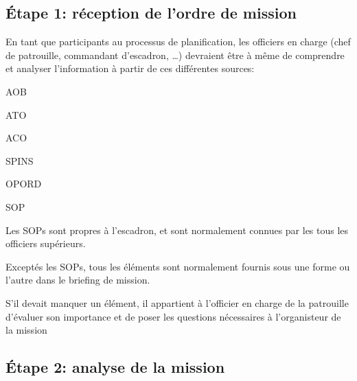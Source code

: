 \subsection{Étape 1: réception de l’ordre de mission}

\e
    \item
    En tant que participants au processus de planification, les officiers en charge (chef de patrouille, commandant d’escadron, …) devraient être à même de comprendre et analyser l’information à partir de ces différentes sources:
    \ee
        \item AOB
        \item ATO
        \item ACO
        \item SPINS
        \item OPORD
        \item SOP
    \ed
    \item Les SOPs sont propres à l'escadron, et sont normalement connues par les tous les officiers supérieurs.
    \item Exceptés les SOPs, tous les éléments sont normalement fournis sous une forme ou l'autre dans le briefing de mission.
    \item
    S'il devait manquer un élément, il appartient à l'officier en charge de la patrouille d'évaluer son importance et de poser les questions nécessaires à l'organisteur de la mission
\ed

\subsection{Étape 2: analyse de la mission}

